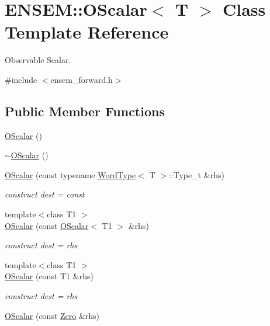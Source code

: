 \hypertarget{classENSEM_1_1OScalar}{}\section{E\+N\+S\+EM\+:\+:O\+Scalar$<$ T $>$ Class Template Reference}
\label{classENSEM_1_1OScalar}


Observable Scalar.  




{\ttfamily \#include $<$ensem\+\_\+forward.\+h$>$}

\subsection*{Public Member Functions}
\begin{DoxyCompactItemize}
\item 
\mbox{\hyperlink{classENSEM_1_1OScalar_abd51915d3c7af4b8ea33923eee128c2c}{O\+Scalar}} ()
\item 
\mbox{\hyperlink{classENSEM_1_1OScalar_ac08c93c225f24926096565485406c529}{$\sim$\+O\+Scalar}} ()
\item 
\mbox{\hyperlink{classENSEM_1_1OScalar_a62bd0b52eff623c7e4911aa896c97ccf}{O\+Scalar}} (const typename \mbox{\hyperlink{structENSEM_1_1WordType}{Word\+Type}}$<$ T $>$\+::Type\+\_\+t \&rhs)
\begin{DoxyCompactList}\small\item\em construct dest = const \end{DoxyCompactList}\item 
{\footnotesize template$<$class T1 $>$ }\\\mbox{\hyperlink{classENSEM_1_1OScalar_a12d201aefa6cbf8648247fdcc6f08669}{O\+Scalar}} (const \mbox{\hyperlink{classENSEM_1_1OScalar}{O\+Scalar}}$<$ T1 $>$ \&rhs)
\begin{DoxyCompactList}\small\item\em construct dest = rhs \end{DoxyCompactList}\item 
{\footnotesize template$<$class T1 $>$ }\\\mbox{\hyperlink{classENSEM_1_1OScalar_a63525278c1ba085f57cdc4aafe50aaa9}{O\+Scalar}} (const T1 \&rhs)
\begin{DoxyCompactList}\small\item\em construct dest = rhs \end{DoxyCompactList}\item 
\mbox{\hyperlink{classENSEM_1_1OScalar_a9bc3830b1a4af2e67da73871396ae06c}{O\+Scalar}} (const \mbox{\hyperlink{structENSEM_1_1Zero}{Zero}} \&rhs)

\end{DoxyCompactItemize}
